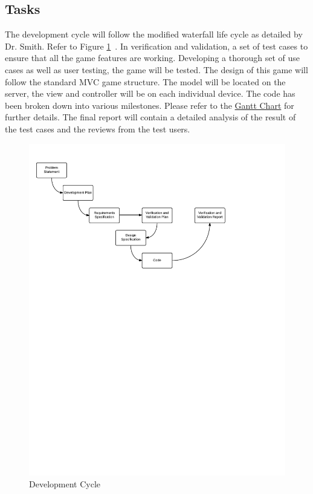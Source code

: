\documentclass[12pt, titlepage]{article}
\begin{document}
\subsection{Tasks}
The development cycle will follow the modified waterfall life cycle as detailed
by Dr. Smith. Refer to Figure \ref{fig:DevelopmentCycle}~\citep{Slides}. In
verification and validation, a set of test cases to ensure that all the game
features are working. Developing a thorough set of use cases as well as user
testing, the game will be tested. The design of this game will follow the
standard MVC game structure. The model will be located on the server, the view
and controller will be on each individual device. The code has been broken down
into various milestones. Please refer to the
\href{run:../../ProjectSchedule/Gantt Chart.gan}{Gantt Chart} for further
details. The final report will contain a detailed analysis of the result of the
test cases and the reviews from the test users.

\begin{figure}
  \includegraphics[width=\linewidth]{OverviewOfProcess.pdf}
  \caption{Development Cycle}
  \label{fig:DevelopmentCycle}
\end{figure}
\end{document}
